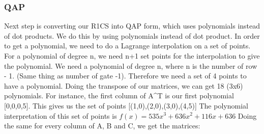   \subsubsection{QAP}
   Next step is converting our R1CS into QAP form, which uses polynomials instead of dot products.
   We do this by using polynomials instead of dot product.
   In order to get a polynomial, we need to do a Lagrange interpolation on a set of points.
   For a polynomial of degree n, we need n+1 set points for the interpolation to give the polynomial.
   We need a polynomial of degree n, where n is the number of row - 1. (Same thing as number of gate -1). 
   Therefore we need a set of 4 points to have a polynomial.
   Doing the transpose of our matrices, we can get 18 (3x6) polynomials.
   For instance, the first column of A^T is our first polynomial [0,0,0,5].
   This gives us the set of points [(1,0),(2,0),(3,0),(4,5)]
   The polynomial interpretation of this set of points is $f(x) = 535x^3+636x^2+116x+636$
   Doing the same for every column of A, B and C, we get the matrices:
